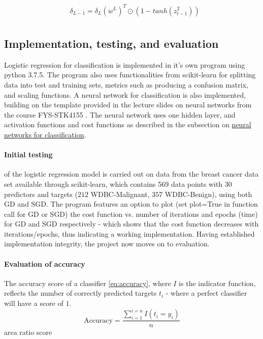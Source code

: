 \documentclass[%
oneside,                 %
final,                   %
10pt]{article}
\begin{document}
\begin{align*}
&\delta_{L-1}=\delta_L(w^{L})^T    \odot (1-tanh(z_{l-1}^2)) \\ 
\end{align*}

\subsection{Implementation, testing, and evaluation}
Logistic regression for classification is implemented in it's own program using python 3.7.5. The program also uses functionalities from scikit-learn \cite{sklearn} for splitting data into test and training sets, metrics such as producing a confusion matrix, and scaling functions. A neural network for classification is also implemented, building on the template provided in the lecture slides on neural networks from the course FYS-STK4155 \cite{MHJ_NN}. The neural network uses one hidden layer, and activation functions and cost functions as described in the subsection on \hyperref[Section_M_NNclass]{neural networks for classification}. 

\paragraph{Initial testing} of the logistic regression model is carried out on data from the breast cancer data set available through scikit-learn, which contains 569 data points with 30 predictors and targets ($212$ WDBC-Malignant, $ 357$
WDBC-Benign), using both GD and SGD. The program features an option to plot (set plot=True in function call for GD or SGD) the cost function vs. number of iterations and epochs (time) for GD and SGD respectively - which shows that the cost function decreases with iterations/epochs, thus indicating a working implementation.  Having established implementation integrity, the project now moves on to evaluation.

\paragraph{Evaluation of accuracy}
The accuracy score of a classifier \eqref{eq:accuracy}, where $I$ is the indicator function, reflects the number of correctly predicted targets $t_i$ - where a perfect classifier will have a score of $1$. 
\begin{equation}
\text{Accuracy}=\frac{\sum_{i=1}^{i=n}I(t_i=y_i)}{n}
\label{eq:accuracy}
\end{equation}
area ratio score
\end{document}
